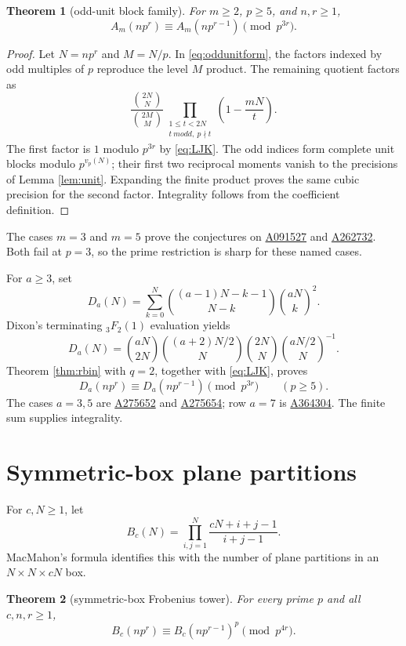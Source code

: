 \documentclass[11pt]{article}
\newtheorem{theorem}{Theorem}[section]
\theoremstyle{definition}
\newcommand{\OEIS}[1]{\href{https://oeis.org/#1}{#1}}
\begin{document}
\begin{theorem}[odd-unit block family]\label{thm:oddblock}
For $m\geq2$, $p\geq5$, and $n,r\geq1$,
\[
 A_m(np^r)\equiv A_m(np^{r-1})\pmod {p^{3r}}.
\]
\end{theorem}

\begin{proof}
Let $N=np^r$ and $M=N/p$.  In \eqref{eq:oddunitform}, the factors indexed
by odd multiples of $p$ reproduce the level $M$ product.  The remaining
quotient factors as
\[
 \frac{\binom{2N}{N}}{\binom{2M}{M}}
 \prod_{\substack{1\leq t<2N\\t\ {
m odd},\ p\nmid t}}
 \left(1-\frac{mN}{t}\right).
\]
The first factor is $1$ modulo $p^{3r}$ by \eqref{eq:LJK}.  The odd
indices form complete unit blocks modulo $p^{v_p(N)}$; their first two
reciprocal moments vanish to the precisions of Lemma \ref{lem:unit}.
Expanding the finite product proves the same cubic precision for the second
factor.  Integrality follows from the coefficient definition.
\end{proof}

The cases $m=3$ and $m=5$ prove the conjectures on \OEIS{A091527} and
\OEIS{A262732}.  Both fail at $p=3$, so the prime restriction is sharp for
these named cases.

For $a\geq3$, set
\[
 D_a(N)=\sum_{k=0}^N
 \binom{(a-1)N-k-1}{N-k}\binom{aN}{k}^2.
\]
Dixon's terminating ${}_3F_2(1)$ evaluation yields
\[
 D_a(N)=\binom{aN}{2N}
 \binom{(a+2)N/2}{N}\binom{2N}{N}
 \binom{aN/2}{N}^{-1}.
\]
Theorem \ref{thm:rbin} with $q=2$, together with \eqref{eq:LJK}, proves
\[
 D_a(np^r)\equiv D_a(np^{r-1})\pmod {p^{3r}}
 \qquad(p\geq5).
\]
The cases $a=3,5$ are \OEIS{A275652} and \OEIS{A275654}; row $a=7$ is
\OEIS{A364304}.  The finite sum supplies integrality.

\section{Symmetric-box plane partitions}

For $c,N\geq1$, let
\[
 B_c(N)=\prod_{i,j=1}^N\frac{cN+i+j-1}{i+j-1}.
\]
MacMahon's formula identifies this with the number of plane partitions in
an $N\times N\times cN$ box.

\begin{theorem}[symmetric-box Frobenius tower]\label{thm:box}
For every prime $p$ and all $c,n,r\geq1$,
\[
 B_c(np^r)\equiv B_c(np^{r-1})^p\pmod {p^{4r}}.
\]
\end{theorem}
\end{document}
